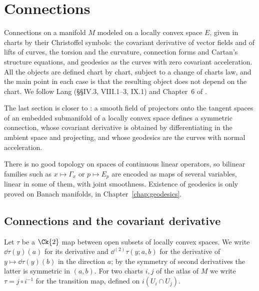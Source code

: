 \chapter{Connections}
\label{chap:connections}

Connections on a manifold $M$ modeled on a locally convex space $E$, given in charts by their
Christoffel symbols: the covariant derivative of vector fields and of lifts of curves, the torsion
and the curvature, connection forms and Cartan's structure equations, and geodesics as the curves
with zero covariant acceleration. All the objects are defined chart by chart, subject to a change
of charts law, and the main point in each case is that the resulting object does not depend on
the chart. We follow Lang \cite{Lan99} (\S\S IV.3, VIII.1--3, IX.1) and Chapter~6 of
\cite{Lar26}.

The last section is closer to \cite{Lar26}: a smooth field of projectors onto the tangent spaces
of an embedded submanifold of a locally convex space defines a symmetric connection, whose
covariant derivative is obtained by differentiating in the ambient space and projecting, and
whose geodesics are the curves with normal acceleration.

There is no good topology on spaces of continuous linear operators, so bilinear families such as
$x \mapsto \Gamma_x$ or $p \mapsto E_p$ are encoded as maps of several variables, linear in some of
them, with joint smoothness. Existence of geodesics is only proved on Banach manifolds, in
Chapter~\ref{chap:geodesics}.

\section{Connections and the covariant derivative}

Let $\tau$ be a $\Ck{2}$ map between open subsets of locally convex spaces. We write
$\dd\tau(y)(a)$ for its derivative and $\dd^{(2)}\tau(y; a, b)$ for the derivative of
$y \mapsto \dd\tau(y)(b)$ in the direction $a$; by the symmetry of second derivatives the latter is
symmetric in $(a, b)$. For two charts $i, j$ of the atlas of $M$ we write $\tau = j \circ i^{-1}$
for the transition map, defined on $i(U_i \cap U_j)$.

